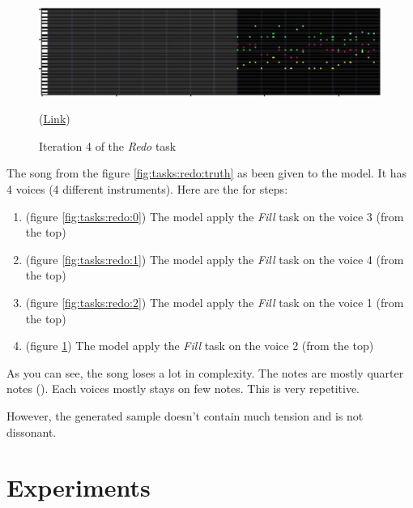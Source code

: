 \documentclass[12pt]{report}
\begin{document}
\begin{figure}[htbp]
    \centering
    \includegraphics[width=\textwidth]{images/generated_midis/tasks/redo/task-redo-3.jpg}
    \caption{Iteration 4 of the \textit{Redo} task}
    (\href{https://github.com/ValentinVignal/midiGenerator/blob/master/samples/tasks/redo_3_(inst_1).mid}{Link})
    \label{fig:tasks:redo:3}
\end{figure}

The song from the figure \ref{fig:tasks:redo:truth} as been given to the model.
It has 4 voices (4 different instruments).
Here are the for steps:
\begin{enumerate}
    \item (figure \ref{fig:tasks:redo:0}) The model apply the \textit{Fill} task on the voice 3 (from the top)
    \item (figure \ref{fig:tasks:redo:1}) The model apply the \textit{Fill} task on the voice 4 (from the top)
    \item (figure \ref{fig:tasks:redo:2}) The model apply the \textit{Fill} task on the voice 1 (from the top)
    \item (figure \ref{fig:tasks:redo:3}) The model apply the \textit{Fill} task on the voice 2 (from the top)
\end{enumerate}

As you can see, the song loses a lot in complexity.
The notes are mostly quarter notes (\musQuarter).
Each voices mostly stays on few notes.
This is very repetitive.

However, the generated sample doesn't contain much tension and is not dissonant.


\chapter{Experiments}
\label{chap:experiments}

\end{document}
